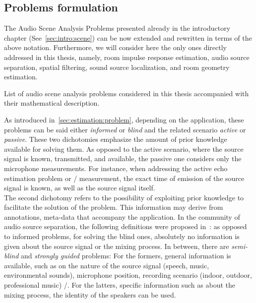 \subsection{Problems formulation}
The Audio Scene Analysis Problems presented already in the introductory chapter (See~\cref{sec:intro:scene}) can be now extended and rewritten in terms of the above notation.
Furthermore, we will consider here the only ones directly addressed in this thesis, namely, room impulse response estimation, audio source separation, spatial filtering, sound source localization, and room geometry estimation.

\begin{table}[!h]

    \begin{fullwidth}
    \centering
    \small
    \renewcommand{\arraystretch}{1.3}

    
    \caption{List of audio scene analysis problems considered in this thesis accompanied with their mathematical description.}
    \label{tab:processing:problems}

    \end{fullwidth}

\end{table}

\mynewline
As introduced in~\cref{sec:estimation:problem}, depending on the application, these problems can be said either \textit{informed} or \textit{blind} and the related scenario \textit{active} or \textit{passive}.
These two dichotomies emphasize the amount of prior knowledge available for solving them.
As opposed to the active scenario, where the source signal is known, transmitted, and available, the passive one considers only the microphone measurements.
For instance, when addressing the active echo estimation problem or \RIR/ measurement, the exact time of emission of the source signal is known, as well as the source signal itself.
\\The second dichotomy refers to the possibility of exploiting prior knowledge to facilitate the solution of the problem.
This information may derive from annotations, meta-data that accompany the application.
In the community of audio source separation, the following definitions were proposed in~:
as opposed to informed problems, for solving the blind ones, absolutely no information is given about the source signal or the mixing process.
In between, there are \textit{semi-blind} and \textit{strongly guided} problems:
For the formers, general information is available, such as on the nature of the source signal (speech, music, environmental sounds),
microphone position, recording scenario (indoor, outdoor, professional music) \etc/.
For the latters, specific information such as about the mixing process, the identity of the speakers can be used.

